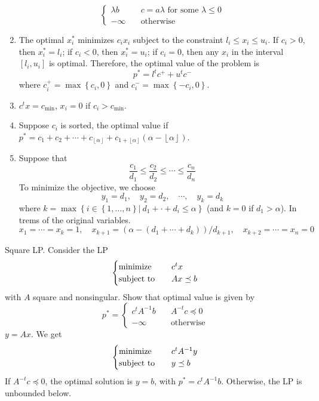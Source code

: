 \begin{problem}[4.8]
\begin{enumerate}
\[\begin{cases}
            \lambda b \quad &c = a\lambda \text{ for some } \lambda \le 0\\
            -\infty \quad &\text{otherwise}
        \end{cases}\]
        \item The optimal $x_i^*$ minimizes $c_ix_i$ subject to the constraint $l_i \le x_i \le u_i$. If $c_i > 0$, then $x_i^* = l_i$; if $c_i < 0$, then $x_i^* = u_i$; if $c_i = 0$, then any $x_i$ in the interval $[l_i, u_i]$ is optimal. Therefore, the optimal value of the problem is \[p^* = l^tc^+ + u^tc^-\] where $c_i^+ = \max\left\{c_i, 0\right\}$ and $c_i^- = \max\left\{-c_i, 0\right\}$.
        \item $c^tx = c_{\min}$, $x_i = 0$ if $c_i > c_{\min}$.
        \item Suppose $c_i$ is sorted, the optimal value if $p^* = c_1 + c_2 + \cdots + c_{\left \lfloor \alpha \right \rfloor } + c_{1 + \left \lfloor \alpha \right \rfloor }(\alpha - \left \lfloor \alpha \right \rfloor )$. 
        \item Suppose that \[\frac{c_{1}}{d_{1}} \leq \frac{c_{2}}{d_{2}} \leq \cdots \leq \frac{c_{n}}{d_{n}}\] To minimize the objective, we choose \[y_1 = d_1, \quad y_2 = d_2, \quad \cdots, \quad y_k = d_k\] where $k = \max\left\{i \in \left\{1, \dots, n\right\} |\ d_1 + \cdot + d_i \le \alpha\right\}$ (and $k = 0$ if $d_1 > \alpha$). In trems of the original variables.\[x_{1}=\cdots=x_{k}=1, \quad x_{k+1}=\left(\alpha-\left(d_{1}+\cdots+d_{k}\right)\right) / d_{k+1}, \quad x_{k+2}=\cdots=x_{n}=0\]
    \end{enumerate}
\end{problem}

\begin{problem}[4.9]
    Square LP. Consider the LP \[\begin{cases}
        \operatorname{minimize} \quad &c^tx \\
        \operatorname{subject\ to} \quad &Ax \preceq b
    \end{cases}\] with $A$ square and nonsingular. Show that optimal value is given by \[p^* = \begin{cases}
        c^tA^{-1}b \quad &A^{-t}c \preceq 0\\
        -\infty \quad &\text{otherwise}
    \end{cases}\]
    \Answer $y = Ax$. We get \[\begin{cases}
        \operatorname{minimize}\quad &c^tA^{-1}y\\
        \operatorname{subject\ to}\quad &y \preceq b
    \end{cases}\] If $A^{-t}c \preceq 0$, the optimal solution is $y = b$, with $p^* = c^tA^{-1}b$. Otherwise, the LP is unbounded below.
\end{problem}

